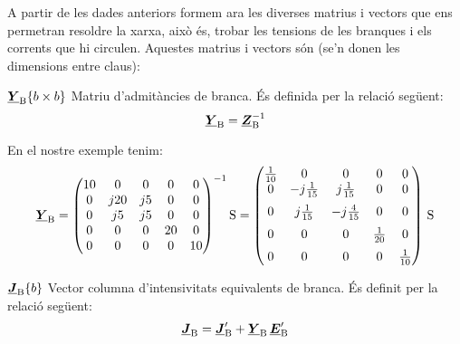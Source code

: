 A partir de les dades anteriors formem ara les diverses matrius i
vectors que ens permetran resoldre la xarxa, això és, trobar les
tensions de les branques i els corrents que hi circulen. Aquestes
matrius i vectors són (se'n donen les dimensions entre claus):

\begin{list}{}
{\setlength{\labelwidth}{20mm} \setlength{\leftmargin}{22mm} \setlength{\labelsep}{2mm}}
   \item[$\underline{\boldsymbol{Y}}_\mathrm{B}\{b\times b\}$] Matriu d'admitàncies de branca. És definida per la relació següent:
   \begin{equation}
      \underline{\boldsymbol{Y}}_\mathrm{B} = \underline{\boldsymbol{Z}}_\mathrm{B}^{-1}
   \end{equation}

   En el nostre exemple tenim:
   \[
      \mcmplx{Y}\ped{B} = \begin{pmatrix}
            10 & 0 & 0 & 0 & 0 \\
            0 & j 20 & j 5 & 0 & 0 \\
            0 & j 5 & j 5 & 0 & 0 \\
            0 & 0 & 0 & 20 & 0 \\
            0 & 0 & 0 & 0 & 10
      \end{pmatrix} ^{-1}\unit{S} =
      \begin{pmatrix}
            \frac{1}{10} & 0 & 0 & 0 & 0 \\
            0 & -j\frac{1}{15} & j\frac{1}{15} & 0 & 0 \\[2mm]
            0 & j\frac{1}{15} & -j\frac{4}{15} & 0 & 0 \\[2mm]
            0 & 0 & 0 & \frac{1}{20} & 0 \\[2mm]
            0 & 0 & 0 & 0 & \frac{1}{10}
      \end{pmatrix}\,\unit{S}
   \]

   \item[$\underline{\boldsymbol{J}}_\mathrm{B}\{b\}$] Vector columna d'intensivitats  equivalents de branca. És definit per la relació següent:
   \begin{equation}
      \underline{\boldsymbol{J}}_\mathrm{B} = \underline{\boldsymbol{J}}'_\mathrm{B}  + \underline{\boldsymbol{Y}}_\mathrm{B} \,\underline{\boldsymbol{E}}'_\mathrm{B}
   \end{equation}


\end{list}
